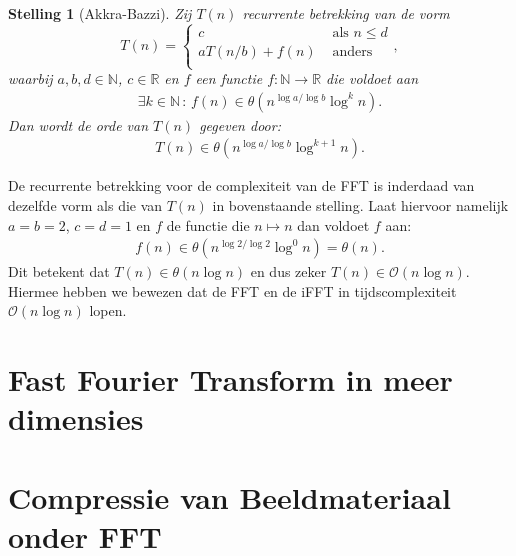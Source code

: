 \documentclass[11pt]{amsart}
\newcommand{\R}{\mathbb{R}}
\newcommand{\N}{\mathbb{N}}
\renewcommand{\O}{\mathcal{O}}
\newtheorem*{stelling}{Stelling}
\newcommand{\eq}[1]{\begin{eqnarray*} #1 \end{eqnarray*}}
\begin{document}
\begin{stelling}[Akkra-Bazzi]
Zij $T(n)$ recurrente betrekking van de vorm
\[
T(n) = \begin{cases}
  c &\text{ als } n \leq d \\
  a T(n/b) + f(n) &\text{ anders} \\
\end{cases},
\]
waarbij $a,b,d\in\N$, $c\in\R$ en $f$ een functie $f:\N\rightarrow\R$ die voldoet aan 
\eq{
  \exists k \in \N \,:\, f(n) \in \theta(n^{\log a/\log b} \log^k n).
}
Dan wordt de orde van $T(n)$ gegeven door:
\eq{
  T(n) \in \theta(n^{\log a / \log b} \log^{k+1}n).
}
\end{stelling}

De recurrente betrekking voor de complexiteit van de FFT is inderdaad van dezelfde vorm als die van $T(n)$ in bovenstaande stelling.
Laat hiervoor namelijk $a=b=2$, $c=d=1$ en $f$ de functie die $n\mapsto n$ dan voldoet $f$ aan:
\eq{
  f(n) \in \theta(n^{\log 2/\log 2} \log^0 n)=\theta(n).
}
Dit betekent dat $T(n) \in \theta(n \log n)$ en dus zeker $T(n) \in \O(n \log n)$.
Hiermee hebben we bewezen dat de FFT en de iFFT in tijdscomplexiteit $\O(n\log n)$ lopen. 

\section{Fast Fourier Transform in meer dimensies}
{}

\section{Compressie van Beeldmateriaal onder FFT}
{}
\end{document}
